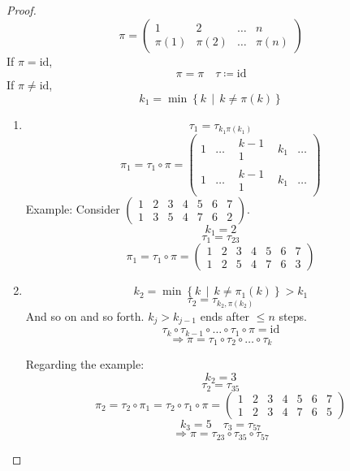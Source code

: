 \documentclass[a4paper,landscape,twocolumn]{article}
\newcommand\setdef[2]{\left\{#1\,\middle|\,#2\right\}}
\begin{document}
\begin{proof}
  \[
    \pi = \begin{pmatrix}
      1 & 2 & \ldots & n \\
      \pi(1) & \pi(2) & \ldots & \pi(n)
    \end{pmatrix}
  \]
  If $\pi = \text{id}$,
  \[ \pi = \pi \quad \tau \coloneqq \text{id} \]
  If $\pi \neq \text{id}$,
  \[ k_1 = \min\setdef{k}{k \neq \pi(k)} \]
  \begin{enumerate}
    \item
      \[ \tau_1 = \tau_{k_1 \pi(k_1)} \]
      \[
        \pi_1 = \tau_1 \circ \pi =
        \begin{pmatrix}
          1 & \ldots & \substack{k-1 \\ 1} & k_1 & \ldots \\
          1 & \ldots & \substack{k-1 \\ 1} & k_1 & \ldots
        \end{pmatrix}
      \]
      Example:
      Consider $\begin{pmatrix}
        1 & 2 & 3 & 4 & 5 & 6 & 7 \\
        1 & 3 & 5 & 4 & 7 & 6 & 2
      \end{pmatrix}$.
      \[ k_1 = 2 \]
      \[ \tau_1 = \tau_{23} \]
      \[
        \pi_1 = \tau_1 \circ \pi =
        \begin{pmatrix}
          1 & 2 & 3 & 4 & 5 & 6 & 7 \\
          1 & 2 & 5 & 4 & 7 & 6 & 3
        \end{pmatrix}
      \]
    \item
      \[ k_2 = \min\setdef{k}{k \neq \pi_1(k)} > k_1 \]
      \[ \tau_2 = \tau_{k_2,\pi(k_2)} \]
      And so on and so forth. $k_j > k_{j-1}$ ends after $\leq n$ steps.
      \[ \tau_k \circ \tau_{k-1} \circ \ldots \circ \tau_1 \circ \pi = \text{id} \]
      \[ \Rightarrow \pi = \tau_1 \circ \tau_2 \circ \ldots \circ \tau_k \]

      Regarding the example:
      \[ k_2 = 3 \]
      \[ \tau_2 = \tau_{35} \]
      \[
        \pi_2 = \tau_2 \circ \pi_1 = \tau_2 \circ \tau_1 \circ \pi =
        \begin{pmatrix}
          1 & 2 & 3 & 4 & 5 & 6 & 7 \\
          1 & 2 & 3 & 4 & 7 & 6 & 5
        \end{pmatrix}
      \]
      \[ k_3 = 5 \quad \tau_3 = \tau_{57} \]
      \[ \Rightarrow \pi = \tau_{23} \circ \tau_{35} \circ \tau_{57} \]
  \end{enumerate}
\end{proof}
\end{document}
